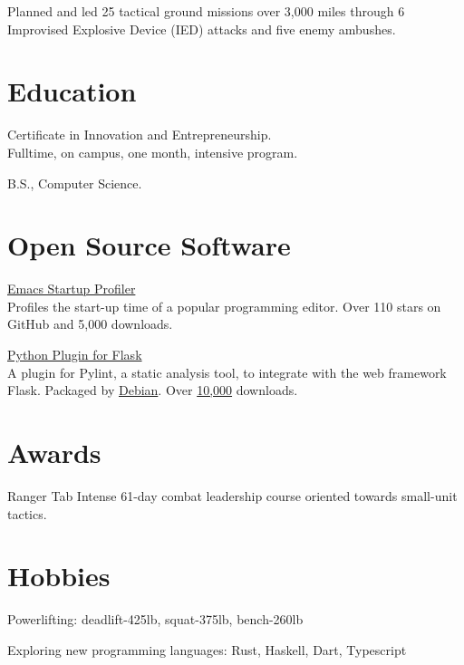 \documentclass[letterpaper,11pt]{jschaf-resume}
\newcommand*{\action}[1]{{\semibold #1}}
\begin{document}
\begin{paracol}{2}
\begin{workitems}
\item \action{Planned} and \action{led} 25 tactical ground missions over 3,000 miles through 6
  Improvised Explosive Device (IED) attacks and five enemy ambushes.
\end{workitems}

\section*{Education}

Certificate in Innovation and Entrepreneurship.\\
Fulltime, on campus, one month, intensive program.

B.S., Computer Science.

\switchcolumn

\section*{Open Source Software}

\href{https://github.com/jschaf/esup}{Emacs Startup Profiler}\\
Profiles the start-up time of a popular programming editor.  Over 110 stars on
GitHub and 5,000 downloads.

\href{https://github.com/jschaf/pylint-flask}{Python Plugin for Flask}\\
A plugin for Pylint, a static analysis tool, to integrate with the web framework
Flask.  Packaged by
\href{https://packages.debian.org/sid/main/python3-pylint-flask}{Debian}.  Over
\href{http://pypi-ranking.info/module/pylint-flask}{10,000} downloads.


\section*{Awards}
Ranger Tab Intense 61-day combat leadership course oriented towards small-unit
tactics.


\section*{Hobbies}
Powerlifting: deadlift-425lb, squat-375lb, bench-260lb

Exploring new programming languages: Rust, Haskell, Dart, Typescript

\end{paracol}

\end{document}
